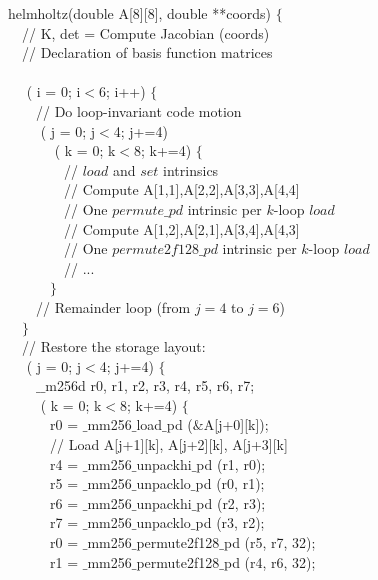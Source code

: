 \documentclass[conference]{IEEEtran}
\begin{document}
\begin{algorithm}[t]
\footnotesize
{} helmholtz(double A[8][8], double **coords) $\lbrace$\\
~~// K, det = Compute Jacobian (coords) \\
~~// Declaration of basis function matrices \\
~~\\
~~ ( i = 0; i$<$6; i++) $\lbrace$ \\
~~~~// Do loop-invariant code motion \\
~~~~ ( j = 0; j$<$4; j+=4) \\
~~~~~~ ( k = 0; k$<$8; k+=4) $\lbrace$\\
~~~~~~~~// $load$ and $set$ intrinsics \\
~~~~~~~~// Compute A[1,1],A[2,2],A[3,3],A[4,4] \\
~~~~~~~~// One $permute\_pd$ intrinsic per $k$-loop $load$\\
~~~~~~~~// Compute A[1,2],A[2,1],A[3,4],A[4,3] \\
~~~~~~~~// One $permute2f128\_pd$ intrinsic per $k$-loop $load$\\
~~~~~~~~// ...\\
~~~~~~$\rbrace$\\
~~~~// Remainder loop (from $j=4$ to $j=6$)\\
~~$\rbrace$\\
~~// Restore the storage layout:\\
~~ ( j = 0; j$<$4; j+=4) $\lbrace$\\
~~~~$\_\_$m256d r0, r1, r2, r3, r4, r5, r6, r7;\\
~~~~ ( k = 0; k$<$8; k+=4) $\lbrace$\\
~~~~~~r0 = $\_$mm256$\_$load$\_$pd ($\&$A[j+0][k]);\\
~~~~~~// Load A[j+1][k], A[j+2][k], A[j+3][k]\\
~~~~~~r4 = $\_$mm256$\_$unpackhi$\_$pd (r1, r0);\\
~~~~~~r5 = $\_$mm256$\_$unpacklo$\_$pd (r0, r1);\\
~~~~~~r6 = $\_$mm256$\_$unpackhi$\_$pd (r2, r3);\\
~~~~~~r7 = $\_$mm256$\_$unpacklo$\_$pd (r3, r2);\\
~~~~~~r0 = $\_$mm256$\_$permute2f128$\_$pd (r5, r7, 32);\\
~~~~~~r1 = $\_$mm256$\_$permute2f128$\_$pd (r4, r6, 32);\\

\end{algorithm}
\end{document}
